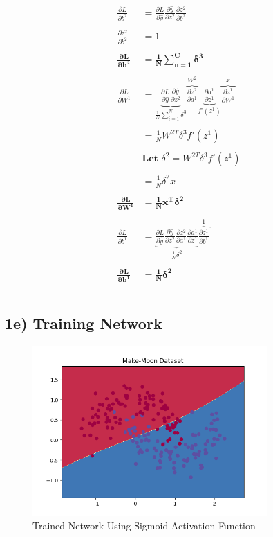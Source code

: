 \documentclass{article}
\begin{document}
	\begin{align*}
		\frac{\partial L}{\partial b^2} &= \frac{\partial L}{\partial \hat{y}}\frac{\partial \hat{y}}{\partial z^2}\frac{\partial z^2}{\partial b^2}\\ \\
		\frac{\partial z^2}{\partial b^2} &= 1\\\\
		\boldsymbol{\frac{\partial L}{\partial b^2}} & \boldsymbol{=\frac{1}{N}\sum_{n=1}^C\delta^3}
	\\
	\\
		\frac{\partial L}{\partial W^1} &=\underbrace{ \frac{\partial L}{\partial \hat{y}}\frac{\partial \hat{y}}{\partial z^2}}_{\frac{1}{N}\sum_{i=1}^N\delta^3}
			\overbrace{\frac{\partial z^2}{\partial a^1}}^{W^2}
			\underbrace{\frac{\partial a^1}{\partial z^1}}_{f'(z^1)}
			\overbrace{\frac{\partial z^1}{\partial W^1}}^x\\ \\
		&= \frac{1}{N}W^{2T}\delta^3f'(z^1)\\ \\
		& \textbf{Let } \delta^2 = W^{2T}\delta^3f'(z^1)\\ \\
		&= \frac{1}{N}\delta^2x\\ \\
		\boldsymbol{\frac{\partial L}{\partial W^1}} & \boldsymbol{= \frac{1}{N}x^T\delta^2}
	\\
	\\
		\frac{\partial L}{\partial b^1} &= \underbrace{\frac{\partial L}{\partial \hat{y}}
			\frac{\partial \hat{y}}{\partial z^2}
			\frac{\partial z^2}{\partial a^1}
			\frac{\partial a^1}{\partial z^1}}_{\frac{1}{N}\delta^2}
			\overbrace{\frac{\partial z^1}{\partial b^1}}^1\\ \\
		\boldsymbol{\frac{\partial L}{\partial b^1}} &\boldsymbol{= \frac{1}{N}\delta^2}\\ \\
	\end{align*}
	
\subsection*{1e) Training Network}
	\begin{figure}[!htb]
		\centering
		\includegraphics[width=90mm]{figures/sigmoid.png}
		\caption{Trained Network Using Sigmoid Activation Function}
	\end{figure}
	
\end{document}

